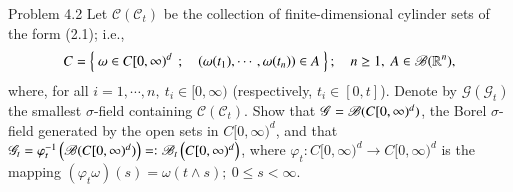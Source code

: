 \begin{itembox}[l]{Problem 4.2}
	Let $\mathscr{C}(\mathscr{C}_t)$ be the collection of finite-dimensional cylinder sets of the form (2.1); i.e.,
	\begin{align}
		C = \left\{\ \omega \in C[0,\infty)^d\ \, ; \quad (\omega(t_1),\cdots,\omega(t_n)) \in A\ \right\};
		\quad n \geq 1,\ A \in \mathscr{B}(\mathbb{R}^n),
	\end{align}
	where, for all $i=1,\cdots,n,\ t_i \in [0,\infty)$ (respectively, $t_i \in [0,t]$).
	Denote by $\mathscr{G}(\mathscr{G}_t)$ the smallest $\sigma$-field containing $\mathscr{C}(\mathscr{C}_t)$.
	Show that $\mathscr{G} = \mathscr{B}(C[0,\infty)^d)$, the Borel $\sigma$-field generated by the open sets in
	$C[0,\infty)^d$, and that $\mathscr{G}_t = \varphi_t^{-1}\left( \mathscr{B}(C[0,\infty)^d) \right) =\mathrel{\mathop:}
	\mathscr{B}_t\left( C[0,\infty)^d \right)$, where $\varphi_t:C[0,\infty)^d \longrightarrow C[0,\infty)^d$ is the
	mapping $(\varphi_t\omega)(s) = \omega(t \wedge s);\ 0 \leq s < \infty$.
\end{itembox}

